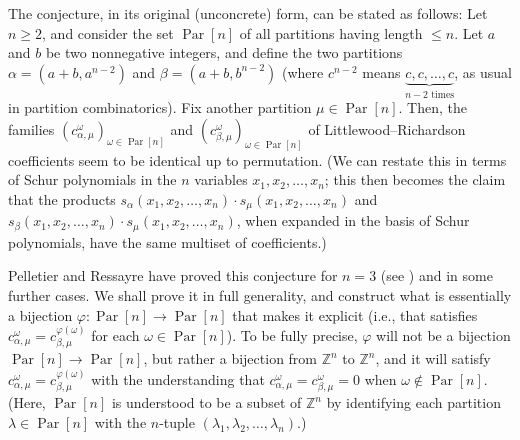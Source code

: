 \documentclass[numbers=enddot,12pt,final,onecolumn,notitlepage]{scrartcl}%
\theoremstyle{definition}
\begin{document}
The conjecture, in its original (unconcrete) form, can be stated as follows:
Let $n\geq2$, and consider the set $\operatorname*{Par}\left[  n\right]  $ of
all partitions having length $\leq n$. Let $a$ and $b$ be two nonnegative
integers, and define the two partitions $\alpha=\left(  a+b,a^{n-2}\right)  $
and $\beta=\left(  a+b,b^{n-2}\right)  $ (where $c^{n-2}$ means
$\underbrace{c,c,\ldots,c}_{n-2\text{ times}}$, as usual in partition
combinatorics). Fix another partition $\mu\in\operatorname*{Par}\left[
n\right]  $. Then, the families $\left(  c_{\alpha,\mu}^{\omega}\right)
_{\omega\in\operatorname*{Par}\left[  n\right]  }$ and $\left(  c_{\beta,\mu
}^{\omega}\right)  _{\omega\in\operatorname*{Par}\left[  n\right]  }$ of
Littlewood--Richardson coefficients seem to be identical up to permutation.
(We can restate this in terms of Schur polynomials in the $n$ variables
$x_{1},x_{2},\ldots,x_{n}$; this then becomes the claim that the products
$s_{\alpha}\left(  x_{1},x_{2},\ldots,x_{n}\right)  \cdot s_{\mu}\left(
x_{1},x_{2},\ldots,x_{n}\right)  $ and $s_{\beta}\left(  x_{1},x_{2}%
,\ldots,x_{n}\right)  \cdot s_{\mu}\left(  x_{1},x_{2},\ldots,x_{n}\right)  $,
when expanded in the basis of Schur polynomials, have the same multiset of coefficients.)

Pelletier and Ressayre have proved this conjecture for $n=3$ (see
\cite[Corollary 2]{PelRes20}) and in some further cases. We shall prove it in
full generality, and construct what is essentially a bijection $\varphi
:\operatorname*{Par}\left[  n\right]  \rightarrow\operatorname*{Par}\left[
n\right]  $ that makes it explicit (i.e., that satisfies $c_{\alpha,\mu
}^{\omega}=c_{\beta,\mu}^{\varphi\left(  \omega\right)  }$ for each $\omega
\in\operatorname*{Par}\left[  n\right]  $). To be fully precise, $\varphi$
will not be a bijection $\operatorname*{Par}\left[  n\right]  \rightarrow
\operatorname*{Par}\left[  n\right]  $, but rather a bijection from
$\mathbb{Z}^{n}$ to $\mathbb{Z}^{n}$, and it will satisfy $c_{\alpha,\mu
}^{\omega}=c_{\beta,\mu}^{\varphi\left(  \omega\right)  }$ with the
understanding that $c_{\alpha,\mu}^{\omega}=c_{\beta,\mu}^{\omega}=0$ when
$\omega\notin\operatorname*{Par}\left[  n\right]  $. (Here,
$\operatorname*{Par}\left[  n\right]  $ is understood to be a subset of
$\mathbb{Z}^{n}$ by identifying each partition $\lambda\in\operatorname*{Par}%
\left[  n\right]  $ with the $n$-tuple $\left(  \lambda_{1},\lambda_{2}%
,\ldots,\lambda_{n}\right)  $.)
\end{document}

